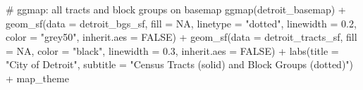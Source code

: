 \documentclass[
  11pt,
]{article}
\newenvironment{Shaded}{\begin{snugshade}}{\end{snugshade}}
\newcommand{\AttributeTok}[1]{\textcolor[rgb]{0.40,0.45,0.13}{#1}}
\newcommand{\CommentTok}[1]{\textcolor[rgb]{0.37,0.37,0.37}{#1}}
\newcommand{\ConstantTok}[1]{\textcolor[rgb]{0.56,0.35,0.01}{#1}}
\newcommand{\FloatTok}[1]{\textcolor[rgb]{0.68,0.00,0.00}{#1}}
\newcommand{\FunctionTok}[1]{\textcolor[rgb]{0.28,0.35,0.67}{#1}}
\newcommand{\NormalTok}[1]{\textcolor[rgb]{0.00,0.23,0.31}{#1}}
\newcommand{\SpecialCharTok}[1]{\textcolor[rgb]{0.37,0.37,0.37}{#1}}
\newcommand{\StringTok}[1]{\textcolor[rgb]{0.13,0.47,0.30}{#1}}
\begin{document}
\begin{Shaded}
\begin{Highlighting}[]
\CommentTok{\# ggmap: all tracts and block groups on basemap}
\FunctionTok{ggmap}\NormalTok{(detroit\_basemap) }\SpecialCharTok{+}
  \FunctionTok{geom\_sf}\NormalTok{(}\AttributeTok{data =}\NormalTok{ detroit\_bgs\_sf, }\AttributeTok{fill =} \ConstantTok{NA}\NormalTok{,}
          \AttributeTok{linetype =} \StringTok{"dotted"}\NormalTok{, }\AttributeTok{linewidth =} \FloatTok{0.2}\NormalTok{, }\AttributeTok{color =} \StringTok{"grey50"}\NormalTok{,}
          \AttributeTok{inherit.aes =} \ConstantTok{FALSE}\NormalTok{) }\SpecialCharTok{+}
  \FunctionTok{geom\_sf}\NormalTok{(}\AttributeTok{data =}\NormalTok{ detroit\_tracts\_sf, }\AttributeTok{fill =} \ConstantTok{NA}\NormalTok{,}
          \AttributeTok{color =} \StringTok{"black"}\NormalTok{, }\AttributeTok{linewidth =} \FloatTok{0.3}\NormalTok{, }\AttributeTok{inherit.aes =} \ConstantTok{FALSE}\NormalTok{) }\SpecialCharTok{+}
  \FunctionTok{labs}\NormalTok{(}\AttributeTok{title =} \StringTok{"City of Detroit"}\NormalTok{,}
       \AttributeTok{subtitle =} \StringTok{"Census Tracts (solid) and Block Groups (dotted)"}\NormalTok{) }\SpecialCharTok{+}
\NormalTok{  map\_theme}
\end{Highlighting}
\end{Shaded}
\end{document}
